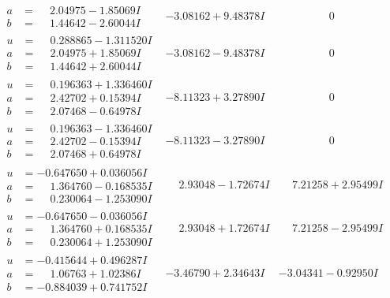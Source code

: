 \documentclass[1p]{elsarticle_modified}
\theoremstyle{definition}
\begin{document}
$$\begin{array}{c|c|c}
\begin{aligned}
a &= \phantom{-}2.04975 - 1.85069 I \\
b &= \phantom{-}1.44642 - 2.60044 I\end{aligned}
 & -3.08162 + 9.48378 I & \phantom{-0.000000 } 0 \\ \hline\begin{aligned}
u &= \phantom{-}0.288865 - 1.311520 I \\
a &= \phantom{-}2.04975 + 1.85069 I \\
b &= \phantom{-}1.44642 + 2.60044 I\end{aligned}
 & -3.08162 - 9.48378 I & \phantom{-0.000000 } 0 \\ \hline\begin{aligned}
u &= \phantom{-}0.196363 + 1.336460 I \\
a &= \phantom{-}2.42702 + 0.15394 I \\
b &= \phantom{-}2.07468 - 0.64978 I\end{aligned}
 & -8.11323 + 3.27890 I & \phantom{-0.000000 } 0 \\ \hline\begin{aligned}
u &= \phantom{-}0.196363 - 1.336460 I \\
a &= \phantom{-}2.42702 - 0.15394 I \\
b &= \phantom{-}2.07468 + 0.64978 I\end{aligned}
 & -8.11323 - 3.27890 I & \phantom{-0.000000 } 0 \\ \hline\begin{aligned}
u &= -0.647650 + 0.036056 I \\
a &= \phantom{-}1.364760 - 0.168535 I \\
b &= \phantom{-}0.230064 - 1.253090 I\end{aligned}
 & \phantom{-}2.93048 - 1.72674 I & \phantom{-}7.21258 + 2.95499 I \\ \hline\begin{aligned}
u &= -0.647650 - 0.036056 I \\
a &= \phantom{-}1.364760 + 0.168535 I \\
b &= \phantom{-}0.230064 + 1.253090 I\end{aligned}
 & \phantom{-}2.93048 + 1.72674 I & \phantom{-}7.21258 - 2.95499 I \\ \hline\begin{aligned}
u &= -0.415644 + 0.496287 I \\
a &= \phantom{-}1.06763 + 1.02386 I \\
b &= -0.884039 + 0.741752 I\end{aligned}
 & -3.46790 + 2.34643 I & -3.04341 - 0.92950 I \\ \hline\begin{aligned}

\end{aligned}
\end{array}$$
\end{document}
